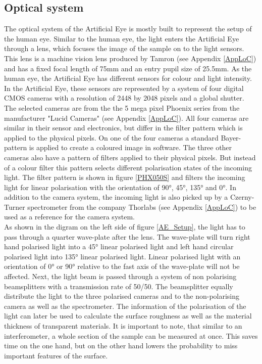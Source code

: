 \subsection{Optical system}
The optical system of the Artificial Eye is mostly built to represent the setup of the human eye. Similar to the human eye, the light enters the Artificial Eye through a lens, which focuses the image of the sample on to the light sensors. This lens is a machine vision lens produced by Tamron (see Appendix \ref{AppLoC}) and has a fixed focal length of 75mm and an entry pupil size of 25.5mm. As the human eye, the Artificial Eye has different sensors for colour and light intensity. In the Artificial Eye, these sensors are represented by a system of four digital CMOS cameras with a resolution of 2448 by 2048 pixels and a global shutter. The selected cameras are from the the 5 mega pixel Phoenix series from the manufacturer "Lucid Cameras" (see Appendix \ref{AppLoC}). All four cameras are similar in their sensor and electronics, but differ in the filter pattern which is applied to the physical pixels. On one of the four cameras a standard Bayer-pattern is applied to create a coloured image in software. The three other cameras also have a pattern of filters applied to their physical pixels. But instead of a colour filter this pattern selects different polarisation states of the incoming light. The filter pattern is shown in figure \ref{PHX050S} and filters the incoming light for linear polarisation with the orientation of 90°, 45°, 135° and 0°. In addition to the camera system, the incoming light is also picked up by a Czerny-Turner spectrometer from the company Thorlabs (see Appendix \ref{AppLoC}) to be used as a reference for the camera system.\\
As shown in the digram on the left side of figure \ref{AE_Setup}, the light has to pass through a quarter wave-plate after the lens. The wave-plate will turn right hand polarised light into a 45° linear polarised light and left hand circular polarised light into 135° linear polarised light. Linear polarised light with an orientation of 0° or 90° relative to the fast axis of the wave-plate will not be affected. Next, the light beam is passed through a system of non polarising beamsplitters with a transmission rate of 50/50. The beamsplitter equally distribute the light to the three polarised cameras and to the non-polarising camera as well as the spectrometer. The information of the polarisation of the light can later be used to calculate the surface roughness as well as the material thickness of transparent materials. It is important to note, that similar to an interferometer, a whole section of the sample can be measured at once. This saves time on the one hand, but on the other hand lowers the probability to miss important features of the surface.

